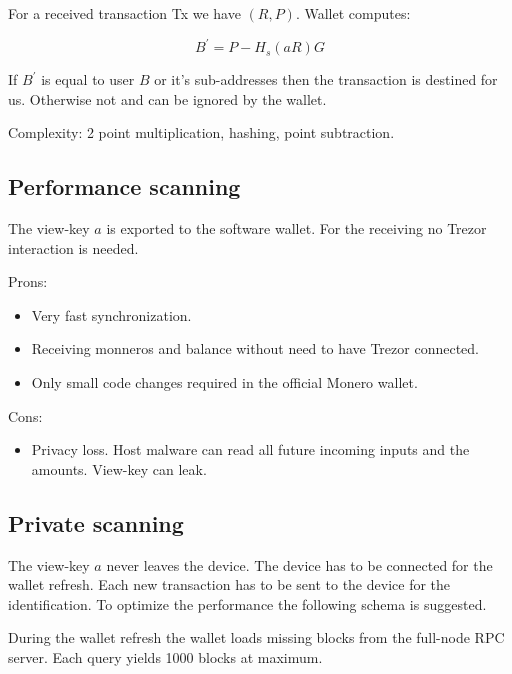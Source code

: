 \documentclass[]{article}
\begin{document}
For a received transaction Tx we have $\left(R, P\right)$.
Wallet computes: 

\begin{equation}
B^\prime = P - H_s(aR)G
\end{equation}

If $B^\prime$ is equal to user $B$ or it's sub-addresses then the transaction is destined for us. Otherwise not and can be ignored by the wallet.

Complexity: 2 point multiplication, hashing, point subtraction.

\subsection{Performance scanning} 
The view-key $a$ is exported to the software wallet. For the receiving no Trezor interaction is needed. 

\noindent Prons:
\begin{itemize}
	\item Very fast synchronization.
	\item Receiving monneros and balance without need to have Trezor connected.
	\item Only small code changes required in the official Monero wallet.
\end{itemize}

\noindent Cons:
\begin{itemize}
	\item Privacy loss. Host malware can read all future incoming inputs and the amounts. View-key can leak.
\end{itemize}

\subsection{Private scanning}
The view-key $a$ never leaves the device. The device has to be connected
for the wallet refresh. 
Each new transaction has to be sent to the device for the identification.
To optimize the performance the following schema is suggested.

\;
During the wallet refresh the wallet loads missing blocks from the full-node RPC server. Each query yields 1000 blocks at maximum. 
\end{document}
